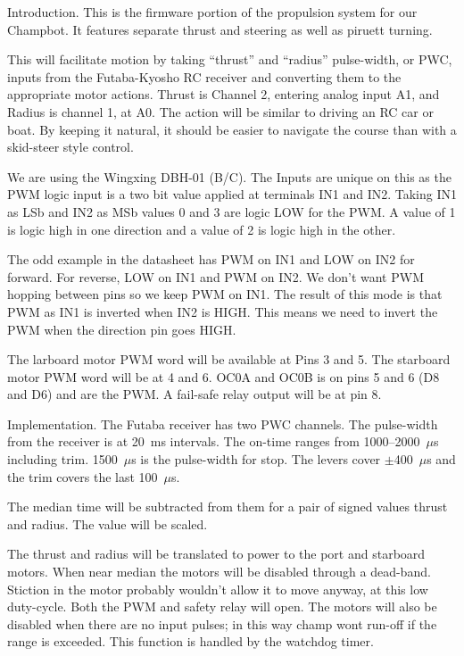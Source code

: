 

%



\nocon %
\datethis %


Introduction. This is the firmware portion of the propulsion system for
our
Champbot.
It features separate thrust and steering as well as piruett turning.

This will facilitate motion by taking ``thrust'' and ``radius'' pulse-width,
or PWC, inputs from the Futaba-Kyosho RC receiver and converting them to the
appropriate motor actions.
Thrust is Channel 2, entering analog input A1, and Radius is channel 1, at A0.
The action will be similar to driving an RC car or boat.
By keeping it natural, it should be easier to navigate the course than with a
skid-steer style control.

We are using the Wingxing DBH-01 (B/C).
The Inputs are unique on this as the PWM logic input is a two bit value applied
at terminals IN1 and IN2.
Taking IN1 as LSb and IN2 as MSb values 0 and 3 are logic LOW for the PWM.
A value of 1 is logic high in one direction and a value of 2 is logic high in
the other.

The odd example in the datasheet has PWM on IN1 and LOW on IN2 for forward.
For reverse, LOW on IN1 and PWM on IN2.
We don't want PWM hopping between pins so we keep PWM on IN1.
The result of this mode is that PWM as IN1 is inverted when IN2 is HIGH.
This means we need to invert the PWM when the direction pin goes HIGH.

The larboard motor PWM word will be available at Pins 3 and 5.
The starboard motor PWM word will be at 4 and 6.
OC0A and OC0B is on pins 5 and 6  (D8 and D6) and are the PWM.
A fail-safe relay output will be at pin 8.

\fi

Implementation.
The Futaba receiver has two PWC channels.
The pulse-width from the receiver is at 20~ms intervals.
The on-time ranges from 1000--2000~$\mu$s including trim.
1500~$\mu$s is the pulse-width for stop.
The levers cover $\pm$400~$\mu$s and the trim covers the last 100~$\mu$s.

The median time will be subtracted from them for a pair of signed values
thrust and radius. The value will be scaled.

The thrust and radius will be translated to power to the
port and starboard motors.
When near median the motors will be disabled through a dead-band.
Stiction in the motor probably wouldn't allow it to move anyway, at this low
duty-cycle. Both the PWM and safety relay will open.
The motors will also be disabled when there are no input pulses; in this way
champ wont run-off if the range is exceeded. This function is handled by the
watchdog timer.

